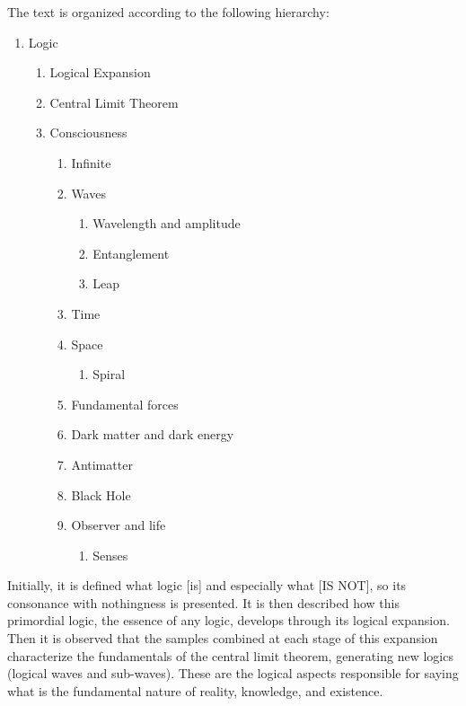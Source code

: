 \noindent The text is organized according to the following hierarchy:
	\begin{enumerate}[label*=\arabic*.]
	   \item Logic
	   \begin{enumerate}[label*=\arabic*.]
		   \item Logical Expansion
		   \item Central Limit Theorem
		   \item Consciousness
			   \begin{enumerate}[label*=\arabic*.]
				   \item Infinite
				   \item Waves 
				   \begin{enumerate}[label*=\arabic*.]
				   		\item Wavelength and amplitude
				   		\item Entanglement
				   		\item Leap
				   \end{enumerate}  
				   \item Time
				   \item Space
				   \begin{enumerate}[label*=\arabic*.]
				   		\item Spiral
				   \end{enumerate} 
				   \item Fundamental forces
				   \item Dark matter and dark energy
				   \item Antimatter
				   \item Black Hole
				   \item Observer and life
				   \begin{enumerate}[label*=\arabic*.]
				   		\item Senses
				   \end{enumerate}  
			   \end{enumerate}   
	   \end{enumerate}
	\end{enumerate}

Initially, it is defined what logic [is] and especially what [IS NOT], so its consonance with nothingness is presented. It is then described how this primordial logic, the essence of any logic, develops through its logical expansion. Then it is observed that the samples combined at each stage of this expansion characterize the fundamentals of the central limit theorem, generating new logics (logical waves and sub-waves). These are the logical aspects responsible for saying what is the fundamental nature of reality, knowledge, and existence. 

\bigbreak